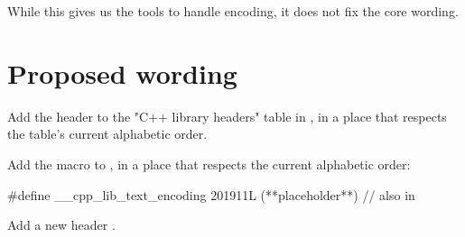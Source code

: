 \documentclass{wg21}
\begin{document}
While this gives us the tools to handle encoding, it does not fix the core wording.

\newpage


\section{Proposed wording}

Add the header  to the "C++ library headers" table in
\tcode{[headers]}, in a place that respects the table’s current alphabetic
order.

Add the macro  to , in a
place that respects the current alphabetic order:

\begin{codeblock}
#define __cpp_lib_text_encoding 201911L (**placeholder**) // also in 
\end{codeblock}

Add a new header .
\end{document}
